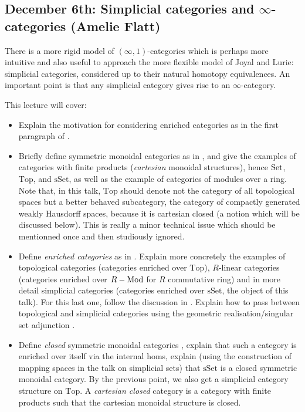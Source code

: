\documentclass{amsart}
\theoremstyle{definition}
\theoremstyle{remark}
\newcommand{\Mod}{\rm Mod}
\newcommand{\Set}{\mathop{\rm Set}\nolimits}
\newcommand{\Top}{\mathrm{Top}}
\newcommand{\sSet}{\mathrm{sSet}}
\begin{document}
\subsection{December 6th: Simplicial categories and $\infty$-categories (Amelie Flatt)}

There is a more rigid model of $(\infty,1)$-categories which is perhaps more intuitive and also useful to approach the more flexible model of Joyal and Lurie: simplicial categories, considered up to their natural homotopy equivalences. An important point is that any simplicial category gives rise to an $\infty$-category.

This lecture will cover:

\begin{itemize}
\item Explain the motivation for considering enriched categories as in the first paragraph of \cite[Chapter 3]{Riehl_cat_hom}.
\item Briefly define symmetric monoidal categories as in \cite[\S 3.1]{Riehl_cat_hom}, and give the examples of categories with finite products (\emph{cartesian} monoidal structures), hence $\Set$, $\Top$, and $\sSet$, as well as the example of categories of modules over a ring. Note that, in this talk, $\Top$ should denote not the category of all topological spaces but a better behaved subcategory, the category of compactly generated weakly Hausdorff spaces, because it is cartesian closed (a notion which will be discussed below). This is really a minor technical issue which should be mentionned once and then studiously ignored.
\item Define \emph{enriched categories} as in \cite[Def. 3.3.1]{Riehl_cat_hom}. Explain more concretely the examples of topological categories (categories enriched over $\Top$), $R$-linear categories (categories enriched over $R-\Mod$ for $R$ commutative ring) and in more detail simplicial categories (categories enriched over $\sSet$, the object of this talk). For this last one, follow the discussion in \cite[\S 3.6]{Riehl_cat_hom}. Explain how to pass between topological and simplicial categories using the geometric realisation/singular set adjunction \cite[end of p.18-top of p.19]{HTT}.
\item Define \emph{closed} symmetric monoidal categories \cite[Def. 3.3.6]{Riehl_cat_hom}, explain that such a category is enriched over itself via the internal homs, explain (using the construction of mapping spaces in the talk on simplicial sets) that $\sSet$ is a closed symmetric monoidal category. By the previous point, we also get a simplicial category structure on $\Top$. A \emph{cartesian closed} category is a category with finite products such that the cartesian monoidal structure is closed.

\end{itemize}
\end{document}
